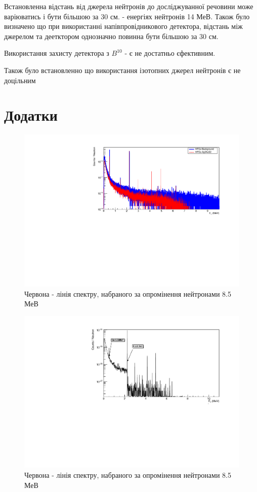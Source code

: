 \documentclass[a4paper, 14pt]{article}
\numberwithin{equation}{section}
\numberwithin{table}{section}
\begin{document}
Встановленна відстань від джерела нейтронів до досліджуванної речовини може варіюватись і бути більшою за 30 см. - енергіях нейтронів 14 МеВ. Також було визначено що при використанні напівпровідникового детектора, відстань між джерелом та деетктором однозначно повинна бути більшою за 30 см. 

Використання захисту детектора з $B^{10}$ - є не достатньо єфективним. 

Також було встановленно що використання ізотопних джерел нейтронів є не доцільним 

\newpage 
\section{Додатки}
\setcounter{figure}{0}
\begin{figure}[h!]
	\centering \includegraphics[width=1\textwidth]{res/Ag3AuS2_8_5MeVFonClasic.pdf}
	\caption{Червона - лінія спектру, набраного за опромінення нейтронами 8.5 МеВ}
	\label{ris:Ag3AuS28_5MeV}	
\end{figure} 
\begin{figure}[h!]
	\centering \includegraphics[width=1\textwidth]{res/AuAgS28MeV.pdf}
	\caption{Червона - лінія спектру, набраного за опромінення нейтронами 8.5 МеВ}
	\label{ris:Ag3AuS22_8MeV}	
\end{figure}
\end{document}
